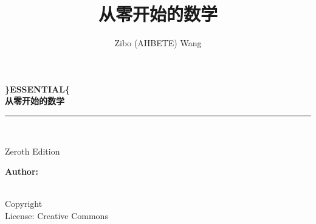 \documentclass[openany]{book}
\title{从零开始的数学}
\author{Zibo (AHBETE) Wang}
\makeatletter
\newcommand{\booksubtitle}{从零开始系列}
\newcommand{\booklicense}{Creative Commons}
\newcommand{\authorsubtitle}{}
\newcommand{\bookauthor}{\@author}
\makeatother
\begin{document}
\frontmatter

\begin{titlepage}
    \begin{flushleft}

        \begin{center}
            \textbf{{\fontsize{42}{42}\selectfont  \}ESSENTIAL\{}\\{\LARGE\selectfont  从零开始的数学}}
        \end{center}%

        \par\noindent\rule{\textwidth}{4pt}\\


        \begin{flushright}
            \large Zeroth Edition
        \end{flushright}

        \vspace{\fill}

        \textbf{\large Author: }\textbf{\large \bookauthor}\\[3.5pt]
        \textbf{\large \textit{\authorsubtitle}}\\

        \vspace{\fill}

    \end{flushleft}
\end{titlepage}
\restoregeometry

\thispagestyle{empty}

\begin{flushleft}
    \vspace*{\fill}
    \vspace{\fill}
    Copyright \textcopyright{} \the\year{}  \bookauthor\\
    License: \booklicense
\end{flushleft}
\end{document}
